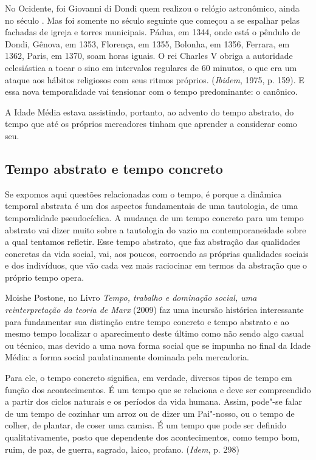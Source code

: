 No Ocidente, foi Giovanni di Dondi quem realizou o relógio astronômico,
ainda no século . Mas foi somente no século seguinte que começou a
se espalhar pelas fachadas de igreja e torres municipais. Pádua, em
1344, onde está o pêndulo de Dondi, Gênova, em 1353, Florença, em 1355,
Bolonha, em 1356, Ferrara, em 1362, Paris, em 1370, soam horas iguais. O
rei Charles V obriga a autoridade eclesiástica a tocar o sino em
intervalos regulares de 60 minutos, o que era um ataque aos hábitos
religiosos com seus ritmos próprios. (\emph{Ibidem}, 1975, p. 159). E
essa nova temporalidade vai tensionar com o tempo predominante: o
canônico.

A Idade Média estava assistindo, portanto, ao advento do tempo abstrato,
do tempo que até os próprios mercadores tinham que aprender a considerar
como seu.

\subsection{Tempo abstrato e tempo concreto}

Se expomos aqui questões relacionadas com o tempo, é porque a dinâmica
temporal abstrata é um dos aspectos fundamentais de uma tautologia, de
uma temporalidade pseudocíclica. A mudança de um tempo concreto para um
tempo abstrato vai dizer muito sobre a tautologia do vazio na
contemporaneidade sobre a qual tentamos refletir. Esse tempo abstrato,
que faz abstração das qualidades concretas da vida social, vai, aos
poucos, corroendo as próprias qualidades sociais e dos indivíduos, que
vão cada vez mais raciocinar em termos da abstração que o próprio tempo
opera.

Moishe Postone, no Livro \emph{Tempo, trabalho e dominação social, uma
reinterpretação da teoria de Marx} (2009) faz uma incursão histórica
interessante para fundamentar sua distinção entre tempo concreto e tempo
abstrato e ao mesmo tempo localizar o aparecimento deste último como não
sendo algo casual ou técnico, mas devido a uma nova forma social que se
impunha no final da Idade Média: a forma social paulatinamente dominada
pela mercadoria.

Para ele, o tempo concreto significa, em verdade, diversos tipos de
tempo em função dos acontecimentos. É um tempo que se relaciona e deve
ser compreendido a partir dos ciclos naturais e os períodos da vida
humana. Assim, pode"-se falar de um tempo de cozinhar um arroz ou de
dizer um Pai"-nosso, ou o tempo de colher, de plantar, de coser uma
camisa. É um tempo que pode ser definido qualitativamente, posto que
dependente dos acontecimentos, como tempo bom, ruim, de paz, de guerra,
sagrado, laico, profano. (\emph{Idem}, p. 298)

